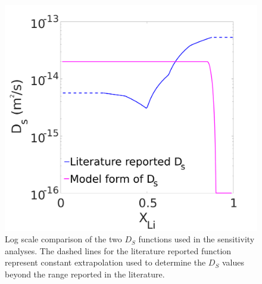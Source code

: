 \documentclass{article}
\newlength{\figwidth}
\begin{document}
\begin{figure}
  \includegraphics[width=\figwidth]{figures/Ds_comparison.pdf}
  \caption{Log scale comparison of the two $D_S$ functions used in the
    sensitivity analyses. The dashed lines for the literature reported
    function represent constant extrapolation used to determine the
    $D_S$ values beyond the range reported in the literature.}
  \label{fig:Ds_comparison}
\end{figure}




\end{document}
